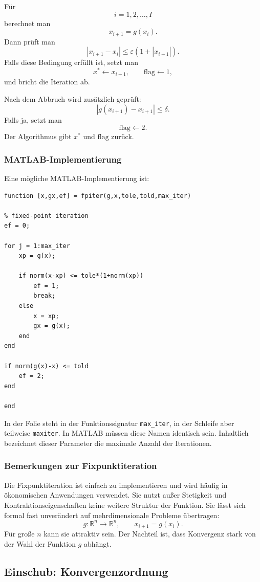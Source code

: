 \documentclass[10pt, letterpaper]{article}
\begin{document}
Für
\[
i=1,2,\dots,I
\]
berechnet man
\[
x_{i+1}=g(x_i).
\]
Dann prüft man
\[
|x_{i+1}-x_i|
\leq
\varepsilon(1+|x_{i+1}|).
\]
Falls diese Bedingung erfüllt ist, setzt man
\[
x^\ast\leftarrow x_{i+1},
\qquad
\text{flag}\leftarrow 1,
\]
und bricht die Iteration ab.

Nach dem Abbruch wird zusätzlich geprüft:
\[
|g(x_{i+1})-x_{i+1}|\leq \delta.
\]
Falls ja, setzt man
\[
\text{flag}\leftarrow 2.
\]
Der Algorithmus gibt \(x^\ast\) und \(\text{flag}\) zurück.

\subsubsection{MATLAB-Implementierung}

Eine mögliche MATLAB-Implementierung ist:

\begin{verbatim}
function [x,gx,ef] = fpiter(g,x,tole,told,max_iter)

% fixed-point iteration
ef = 0;

for j = 1:max_iter
    xp = g(x);

    if norm(x-xp) <= tole*(1+norm(xp))
        ef = 1;
        break;
    else
        x = xp;
        gx = g(x);
    end
end

if norm(g(x)-x) <= told
    ef = 2;
end

end
\end{verbatim}

In der Folie steht in der Funktionssignatur \texttt{max\_iter}, in der Schleife aber teilweise \texttt{maxiter}. In MATLAB müssen diese Namen identisch sein. Inhaltlich bezeichnet dieser Parameter die maximale Anzahl der Iterationen.

\subsubsection{Bemerkungen zur Fixpunktiteration}

Die Fixpunktiteration ist einfach zu implementieren und wird häufig in ökonomischen Anwendungen verwendet. Sie nutzt außer Stetigkeit und Kontraktionseigenschaften keine weitere Struktur der Funktion. Sie lässt sich formal fast unverändert auf mehrdimensionale Probleme übertragen:
\[
g:\mathbb{R}^n\to\mathbb{R}^n,
\qquad
x_{i+1}=g(x_i).
\]
Für große \(n\) kann sie attraktiv sein. Der Nachteil ist, dass Konvergenz stark von der Wahl der Funktion \(g\) abhängt.

\subsection{Einschub: Konvergenzordnung}
\end{document}
